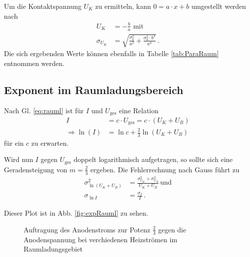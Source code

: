 \documentclass[12pt,a4paper,titlepage,headinclude,bibtotoc]{scrartcl}
\begin{document}
Um die Kontaktspannung $U_K$ zu ermitteln, kann $0=a\cdot x + b$ umgestellt werden nach 
\begin{align*}
U_K &= -\frac{b}{a} \text{ mit}\\
\sigma_{U_K} &= \sqrt{\frac{\sigma_b^2}{a^2}+\frac{\sigma_a^2 \cdot b^2}{a^4}}\, .
\end{align*}
Die sich ergebenden Werte können ebenfalls in Tabelle \ref{tab:ParaRaum} entnommen werden.\\


\subsection{Exponent im Raumladungsbereich}
Nach Gl. \eqref{eq:rauml} ist für $I$ und $U_\text{ges}$ eine Relation
\begin{align}
I &= c\cdot U_\text{ges} = c\cdot \left( U_K+U_B \right)\\
\Rightarrow \ln (I) &= \ln c + \frac{2}{3} \ln \left( U_K + U_B \right)
\end{align}
für ein $c$ zu erwarten.

Wird nun $I$ gegen $U_\text{ges}$ doppelt logarithmisch aufgetragen, so sollte sich eine Geradensteigung von $m=\frac{2}{3}$ ergeben.
Die Fehlerrechnung nach Gauss führt zu
\begin{align}
\sigma_{\ln\left( U_K + U_B \right)}^2 &= \frac{\sigma_{U_K}^2 + \sigma_{U_B}^2}{U_K + U_B}\, \text{und}\\
\sigma_{\ln I} &= \frac{\sigma_I}{I}\,.
\end{align}

Dieser Plot ist in Abb. \ref{fig:expRauml} zu sehen.

\begin{figure}[h]
   \centering
   \hfill
   \hfill
   \caption{Auftragung des Anodenstroms zur Potenz $\frac{2}{3}$ gegen die Anodenspannung bei verchiedenen Heizströmen im Raumladungsgebiet}
   \label{fig:raumladung}
 \end{figure}
\end{document}

